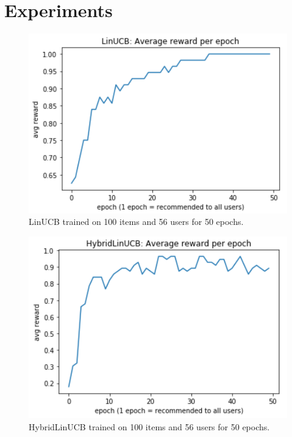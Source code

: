 \documentclass[12pt, titlepage]{article}
\begin{document}
\section{Experiments}\label{sec:exp}

\begin{figure}[h]
 \centering
 \includegraphics[width=\columnwidth]{img/LinUCB-100items-50epochs}
 \caption{LinUCB trained on 100 items and 56 users for 50 epochs.}
 \label{fig:linUCB-100it}
\end{figure}

\begin{figure}[h]
 \centering
 \includegraphics[width=\columnwidth]{img/HybridLinUCB-100items-50epochs}
 \caption{HybridLinUCB trained on 100 items and 56 users for 50 epochs.}
 \label{fig:HybridlinUCB-100it}
\end{figure}
\end{document}
